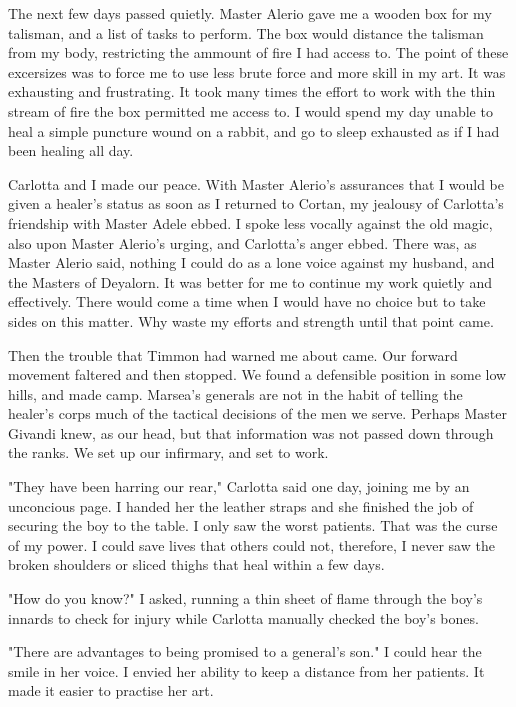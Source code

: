 \documentclass{article}
\begin{document}
\vspace{.5cm}

The next few days passed quietly. Master Alerio gave me a wooden box for my talisman, and a list of tasks to perform. The box would distance the talisman from my body, restricting the ammount of fire I had access to. The point of these excersizes was to force me to use less brute force and more skill in my art. It was exhausting and frustrating. It took many times the effort to work with the thin stream of fire the box permitted me access to. I would spend my day unable to heal a simple puncture wound on a rabbit, and go to sleep exhausted as if I had been healing all day. 

Carlotta and I made our peace. With Master Alerio's assurances that I would be given a healer's status as soon as I returned to Cortan, my jealousy of Carlotta's friendship with Master Adele ebbed. I spoke less vocally against the old magic, also upon Master Alerio's urging, and Carlotta's anger ebbed. There was, as Master Alerio said, nothing I could do as a lone voice against my husband, and the Masters of Deyalorn. It was better for me to continue my work quietly and effectively. There would come a time when I would have no choice but to take sides on this matter. Why waste my efforts and strength until that point came.

Then the trouble that Timmon had warned me about came. Our forward movement faltered and then stopped. We found a defensible position in some low hills, and made camp. Marsea's generals are not in the habit of telling the healer's corps much of the tactical decisions of the men we serve. Perhaps Master Givandi knew, as our head, but that information was not passed down through the ranks. We set up our infirmary, and set to work. 

"They have been harring our rear," Carlotta said one day, joining me by an unconcious page. I handed her the leather straps and she finished the job of securing the boy to the table. I only saw the worst patients. That was the curse of my power. I could save lives that others could not, therefore, I never saw the broken shoulders or sliced thighs that heal within a few days. 

"How do you know?" I asked, running a thin sheet of flame through the boy's innards to check for injury while Carlotta manually checked the boy's bones. 

"There are advantages to being promised to a general's son." I could hear the smile in her voice. I envied her ability to keep a distance from her patients. It made it easier to practise her art. 
\end{document}
